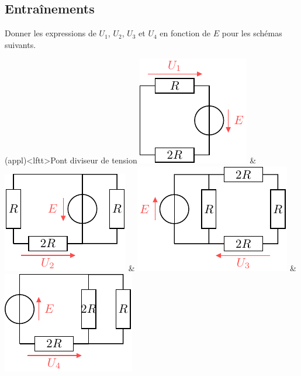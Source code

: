 \documentclass[../../main/main.tex]{subfiles}
\begin{document}
\subsection{Entraînements}
Donner les expressions de $U_1$, $U_2$, $U_3$ et $U_4$ en fonction de $E$
pour les schémas suivants.
\begin{tcb*}[tabularx={Y|Y|Y|Y}](appl)<lftt>{Pont diviseur de tension}
	\vspace{12pt}
	\includegraphics[scale=1]{pdt_a-plain}
	&
	\vspace{12pt}
	\includegraphics[scale=1]{pdt_b-plain}
	&
	\vspace{12pt}
	\includegraphics[scale=1]{pdt_c-plain}
	&
	\vspace{12pt}
	\includegraphics[scale=1]{pdt_d-plain}

\end{tcb*}
\end{document}
